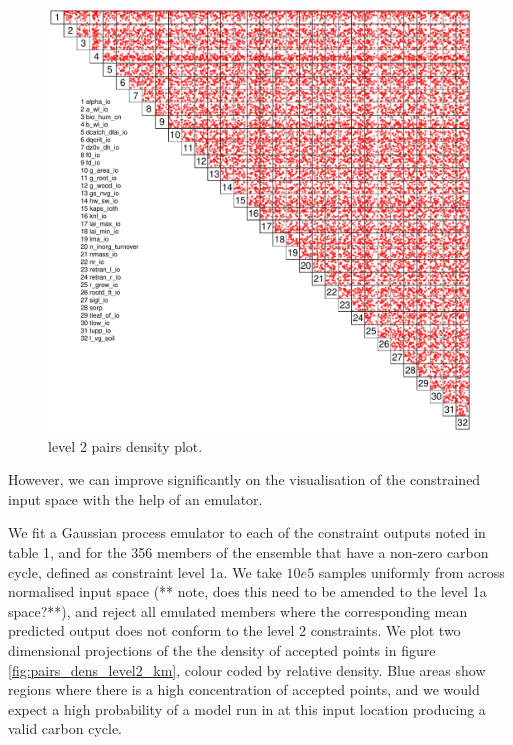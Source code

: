 \documentclass[gmd, manuscript]{copernicus}
\begin{document}
\begin{figure}[t]
\includegraphics[width=12cm]{./graphics/pairs_level2_inputs.pdf}
\caption{level 2 pairs density plot.}
\label{fig:pairs_level2_inputs}
\end{figure}

However, we can improve significantly on the visualisation of the constrained input space with the help of an emulator. 

We fit a Gaussian process emulator to each of the constraint outputs noted in table 1, and for the 356 members of the ensemble that have a non-zero carbon cycle, defined as constraint level 1a. We take $10e5$ samples uniformly from across normalised input space (** note, does this need to be amended to the level 1a space?**), and reject all emulated members where the corresponding mean predicted output does not conform to the level 2 constraints. We plot two dimensional projections of the the density of accepted points in figure \ref{fig:pairs_dens_level2_km}, colour coded by relative density. Blue areas show regions where there is a high concentration of accepted points, and we would expect a high probability of a model run in at this input location producing a valid carbon cycle.
\end{document}
